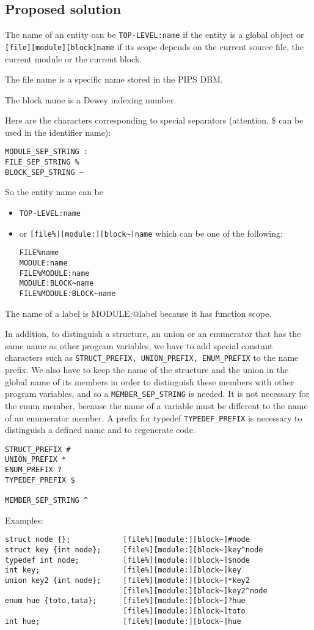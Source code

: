 \documentclass[a4paper]{article}
\begin{document}
\subsection{Proposed solution}
The name of an entity can be \verb/TOP-LEVEL:name/ if the entity is a
global object or  
\verb/[file][module][block]name/ if its scope depends on the current source file,
the current module or the current block. 

The file name is a specific name stored in the PIPS DBM. 

The block name is a Dewey indexing number. 

Here are the characters corresponding to special separators (attention, \$
can be used in the identifier name): 
\begin{verbatim}
MODULE_SEP_STRING :
FILE_SEP_STRING %
BLOCK_SEP_STRING ~
\end{verbatim}  

So the entity name can be 
\begin{itemize}
\item 
\verb/TOP-LEVEL:name/
\item or 
\verb/[file%][module:][block~]name/ which can be one of the following: 
\begin{verbatim}
FILE%name
MODULE:name
FILE%MODULE:name
MODULE:BLOCK~name
FILE%MODULE:BLOCK~name
\end{verbatim}  
\end{itemize} 
The name of a label is MODULE:@label because it has function scope. 

In addition, to distinguish a structure, an union or 
an enumerator that has the same name as other program variables, we have to add 
special constant characters such as \verb/STRUCT_PREFIX, UNION_PREFIX, ENUM_PREFIX/ to the name
prefix. We also have to keep the
name of the structure and the union in the global name of its members in
order to distinguish these members with other program variables, and so a
\verb/MEMBER_SEP_STRING/ is needed. It is not
necessary for the enum member, because the name of a variable must be
different to the name of an enumerator member. 
A prefix for typedef \verb/TYPEDEF_PREFIX/ is necessary to distinguish a
defined name and to regenerate code. 
\begin{verbatim}
STRUCT_PREFIX #
UNION_PREFIX *
ENUM_PREFIX ?
TYPEDEF_PREFIX $

MEMBER_SEP_STRING ^
\end{verbatim}  

Examples: 
\begin{verbatim}
struct node {};            [file%][module:][block~]#node
struct key {int node};     [file%][module:][block~]key^node 
typedef int node;          [file%][module:][block~]$node
int key;                   [file%][module:][block~]key
union key2 {int node};     [file%][module:][block~]*key2 
                           [file%][module:][block~]key2^node 
enum hue {toto,tata};      [file%][module:][block~]?hue
                           [file%][module:][block~]toto 
int hue;                   [file%][module:][block~]hue
\end{verbatim}   
\end{document}
